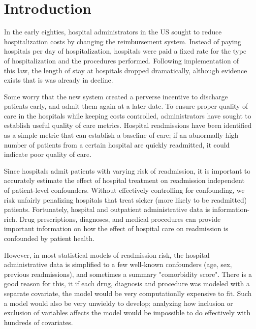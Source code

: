 \documentclass[]{article}\usepackage[]{graphicx}\usepackage[]{color}
\begin{document}
\section{Introduction}
In the early eighties, hospital administrators in the US sought to reduce hospitalization costs by changing the reimbursement system. Instead of paying hospitals per day of hospitalization, hospitals were paid a fixed rate for the type of hospitalization and the procedures performed. Following implementation of this law, the length of stay at hospitals dropped dramatically, although evidence exists that is was already in decline. 

Some worry that the new system created a perverse incentive to discharge patients early, and admit them again at a later date. To ensure proper quality of care in the hospitals while keeping costs controlled, administrators have sought to establish useful quality of care metrics. Hospital readmissions have been identified as a simple metric that can establish a baseline of care; if an abnormally high number of patients from a certain hospital are quickly readmitted, it could indicate poor quality of care. 

Since hospitals admit patients with varying risk of readmission, it is important to accurately estimate the effect of hospital treatment on readmission independent of patient-level confounders. Without effectively controlling for confounding, we risk unfairly penalizing hospitals that treat sicker (more likely to be readmitted) patients. Fortunately, hospital and outpatient administrative data is information-rich. Drug prescriptions, diagnoses, and medical procedures can provide important information on how the effect of hospital care on readmission is confounded by patient health. 

However, in most statistical models of readmission risk, the hospital administrative data is simplified to a few well-known confounders (age, sex, previous readmissions), and sometimes a summary "comorbidity score". There is a good reason for this, it
if each drug, diagnosis and procedure was modeled with a separate covariate, the model would be very computationlly expensive to fit. Such a model would also be very unwieldy to develop; analyzing how inclusion or exclusion of variables affects the model would be impossible to do effectively with hundreds of covariates. 
\end{document}
